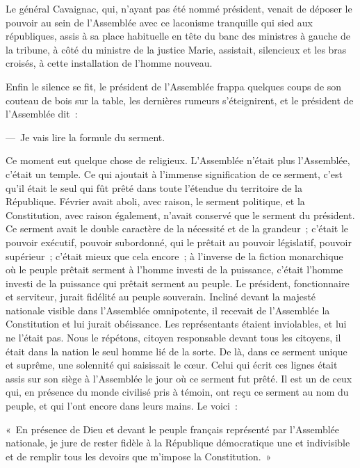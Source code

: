 \documentclass[french,twoside]{book} %
\newenvironment{quoteblock}%
  {\begin{quoting}}
  {\end{quoting}}
\newenvironment{quotebar}{%
    \def\FrameCommand{{\color{rubric!10!}\vrule width 0.5em} \hspace{0.9em}}%
    \def\OuterFrameSep{\itemsep} %
    \MakeFramed {\advance\hsize-\width \FrameRestore}
  }%
  {%
    \endMakeFramed
  }
\renewenvironment{quoteblock}%
  {%
    \savenotes
    \setstretch{0.9}
    \normalfont
    \begin{quotebar}
  }
  {%
    \end{quotebar}
    \spewnotes
  }
\begin{document}
Le général Cavaignac, qui, n’ayant pas été nommé président, venait de déposer le pouvoir au sein de l’Assemblée avec ce laconisme tranquille qui sied aux républiques, assis à sa place habituelle en tête du banc des ministres à gauche de la tribune, à côté du ministre de la justice Marie, assistait, silencieux et les bras croisés, à cette installation de l’homme nouveau.\par
Enfin le silence se fit, le président de l’Assemblée frappa quelques coups de son couteau de bois sur la table, les dernières rumeurs s’éteignirent, et le président de l’Assemblée dit :\par
— Je vais lire la formule du serment.\par
Ce moment eut quelque chose de religieux. L’Assemblée n’était plus l’Assemblée, c’était un temple. Ce qui ajoutait à l’immense signification de ce serment, c’est qu’il était le seul qui fût prêté dans toute l’étendue du territoire de la République. Février avait aboli, avec raison, le serment politique, et la Constitution, avec raison également, n’avait conservé que le serment du président. Ce serment avait le double caractère de la nécessité et de la grandeur ; c’était le pouvoir exécutif, pouvoir subordonné, qui le prêtait au pouvoir législatif, pouvoir supérieur ; c’était mieux que cela encore ; à l’inverse de la fiction monarchique où le peuple prêtait serment à l’homme investi de la puissance, c’était l’homme investi de la puissance qui prêtait serment au peuple. Le président, fonctionnaire et serviteur, jurait fidélité au peuple souverain. Incliné devant la majesté nationale visible dans l’Assemblée omnipotente, il recevait de l’Assemblée la Constitution et lui jurait obéissance. Les représentants étaient inviolables, et lui ne l’était pas. Nous le répétons, citoyen responsable devant tous les citoyens, il était dans la nation le seul homme lié de la sorte. De là, dans ce serment unique et suprême, une solennité qui saisissait le cœur. Celui qui écrit ces lignes était assis sur son siège à l’Assemblée le jour où ce serment fut prêté. Il est un de ceux qui, en présence du monde civilisé pris à témoin, ont reçu ce serment au nom du peuple, et qui l’ont encore dans leurs mains. Le voici :\par

\begin{quoteblock}
 \noindent « En présence de Dieu et devant le peuple français représenté par l’Assemblée nationale, je jure de rester fidèle à la République démocratique une et indivisible et de remplir tous les devoirs que m’impose la Constitution. »
 \end{quoteblock}
\end{document}
